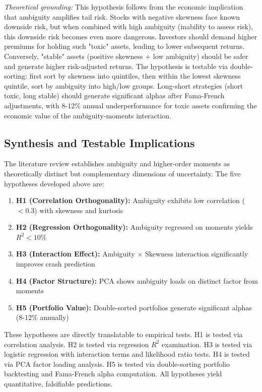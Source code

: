 \documentclass[preprint,12pt,authoryear]{elsarticle}
\begin{document}
\noindent
\textit{Theoretical grounding:} This hypothesis follows from the economic implication that ambiguity amplifies tail risk. Stocks with negative skewness face known downside risk, but when combined with high ambiguity (inability to assess risk), this downside risk becomes even more dangerous. Investors should demand higher premiums for holding such "toxic" assets, leading to lower subsequent returns. Conversely, "stable" assets (positive skewness + low ambiguity) should be safer and generate higher risk-adjusted returns. The hypothesis is testable via double-sorting: first sort by skewness into quintiles, then within the lowest skewness quintile, sort by ambiguity into high/low groups. Long-short strategies (short toxic, long stable) should generate significant alphas after Fama-French adjustments, with 8-12\% annual underperformance for toxic assets confirming the economic value of the ambiguity-moments interaction.

\subsection{Synthesis and Testable Implications}

The literature review establishes ambiguity and higher-order moments as theoretically distinct but complementary dimensions of uncertainty. The five hypotheses developed above are:
\begin{enumerate}
\item \textbf{H1 (Correlation Orthogonality):} Ambiguity exhibits low correlation ($<0.3$) with skewness and kurtosis
\item \textbf{H2 (Regression Orthogonality):} Ambiguity regressed on moments yields $R^2 < 10\%$
\item \textbf{H3 (Interaction Effect):} Ambiguity × Skewness interaction significantly improves crash prediction
\item \textbf{H4 (Factor Structure):} PCA shows ambiguity loads on distinct factor from moments
\item \textbf{H5 (Portfolio Value):} Double-sorted portfolios generate significant alphas (8-12\% annually)
\end{enumerate}

These hypotheses are directly translatable to empirical tests. H1 is tested via correlation analysis. H2 is tested via regression $R^2$ examination. H3 is tested via logistic regression with interaction terms and likelihood ratio tests. H4 is tested via PCA factor loading analysis. H5 is tested via double-sorting portfolio backtesting and Fama-French alpha computation. All hypotheses yield quantitative, falsifiable predictions.
\end{document}
